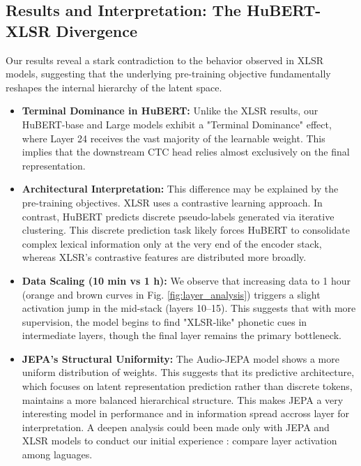 \documentclass[11pt]{article}
\begin{document}
\subsection{Results and Interpretation: The HuBERT-XLSR Divergence}
Our results reveal a stark contradiction to the behavior observed in XLSR models, suggesting that the underlying pre-training objective fundamentally reshapes the internal hierarchy of the latent space.

\begin{itemize}
    \item \textbf{Terminal Dominance in HuBERT:} Unlike the XLSR results, our HuBERT-base and Large models exhibit a "Terminal Dominance" effect, where Layer 24 receives the vast majority of the learnable weight. This implies that the downstream CTC head relies almost exclusively on the final representation. 
    \item \textbf{Architectural Interpretation:} This difference may be explained by the pre-training objectives. XLSR uses a contrastive learning approach. In contrast, HuBERT predicts discrete pseudo-labels generated via iterative clustering. This discrete prediction task likely forces HuBERT to consolidate complex lexical information only at the very end of the encoder stack, whereas XLSR's contrastive features are distributed more broadly.
    \item \textbf{Data Scaling (10 min vs 1 h):} We observe that increasing data to 1 hour (orange and brown curves in Fig. \ref{fig:layer_analysis}) triggers a slight activation jump in the mid-stack (layers 10--15). This suggests that with more supervision, the model begins to find "XLSR-like" phonetic cues in intermediate layers, though the final layer remains the primary bottleneck.
    \item \textbf{JEPA's Structural Uniformity:} The Audio-JEPA model shows a more uniform distribution of weights. This suggests that its predictive architecture, which focuses on latent representation prediction rather than discrete tokens, maintains a more balanced hierarchical structure. This makes JEPA a very interesting model in performance and in information spread accross layer for interpretation. A deepen analysis could been made only with JEPA and XLSR models to conduct our initial experience : compare layer activation among laguages. 
\end{itemize}

\newpage
\end{document}

